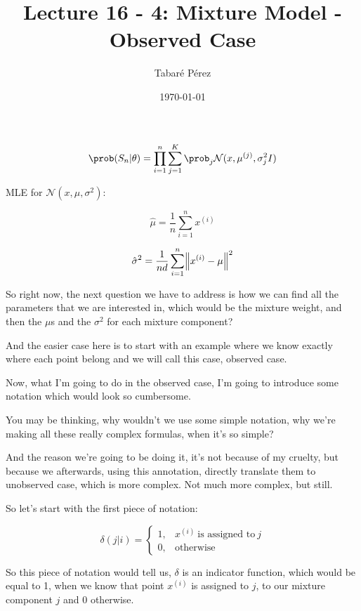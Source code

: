 \documentclass[a4paper, 12pt]{article}
\author{Tabaré Pérez}
\date{\today}
\title{Lecture 16 - 4: Mixture Model - Observed Case}
\begin{document}
\maketitle
\begin{equation}
\label{eq:org2b655ea}
\prob(S_n|\theta) = \prod_{i=1}^{n} \sum_{j=1}^{K} \prob_j \mathcal{N}(x, \mu^{(j)}, \sigma_{j}^{2} I) 
\end{equation}

MLE for \(\mathcal{N}(x, \mu, \sigma^2)\):

\begin{equation}
\label{eq:orge3ed511}
\hat{\mu} = \frac{1}{n} \sum_{i=1}^{n} x^{(i)}
\end{equation}

\begin{equation}
\label{eq:orgf0b75b0}
\hat{\sigma}^2 = \frac{1}{nd} \sum_{i=1}^{n} \norm{x^{(i)} - \mu}^2
\end{equation}

So right now, the next question we have to address is how we can find all the
parameters that we are interested in, which would be the mixture weight, and
then the \(\mu\)s and the \(\sigma^2\) for each mixture component?

And the easier case here is to start with an example where we know exactly where
each point belong and we will call this case, observed case.

Now, what I'm going to do in the observed case, I'm going to introduce some
notation which would look so cumbersome.

You may be thinking, why wouldn't we use some simple notation, why we're making
all these really complex formulas, when it's so simple?

And the reason we're going to be doing it, it's not because of my cruelty, but
because we afterwards, using this annotation, directly translate them to
unobserved case, which is more complex. Not much more complex, but still.

So let's start with the first piece of notation:

\begin{equation}
\label{eq:orge70c7e9}
\delta(j|i) = \left\{
  \begin{array}{ll}
    1 , & x^{(i)}\: \text{is assigned to}\: j  \\
    0 , & \text{otherwise}
  \end{array} \right.
\end{equation}

So this piece of notation would tell us, \(\delta\) is an indicator function,
which would be equal to 1, when we know that point \(x^{(i)}\) is assigned to
\(j\), to our mixture component \(j\) and 0 otherwise.
\end{document}
